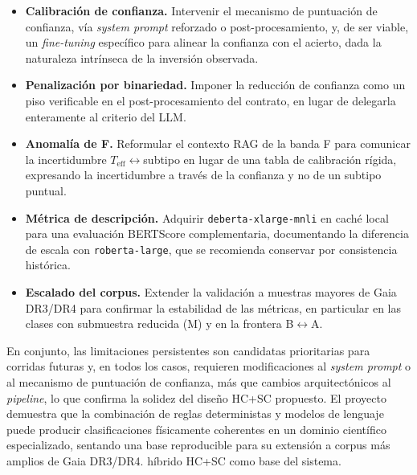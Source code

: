\begin{itemize}
  \item \textbf{Calibración de confianza.} Intervenir el mecanismo de puntuación de
  confianza, vía \emph{system prompt} reforzado o post-procesamiento, y, de ser
  viable, un \emph{fine-tuning} específico para alinear la confianza con el acierto,
  dada la naturaleza intrínseca de la inversión observada.
  \item \textbf{Penalización por binariedad.} Imponer la reducción de confianza como
  un piso verificable en el post-procesamiento del contrato, en lugar de delegarla
  enteramente al criterio del LLM.
  \item \textbf{Anomalía de F.} Reformular el contexto RAG de la banda F para
  comunicar la incertidumbre $T_\mathrm{eff}\leftrightarrow$subtipo en lugar de una
  tabla de calibración rígida, expresando la incertidumbre a través de la confianza
  y no de un subtipo puntual.
  \item \textbf{Métrica de descripción.} Adquirir \texttt{deberta-xlarge-mnli} en
  caché local para una evaluación BERTScore complementaria, documentando la
  diferencia de escala con \texttt{roberta-large}, que se recomienda conservar por
  consistencia histórica.
  \item \textbf{Escalado del corpus.} Extender la validación a muestras mayores de
  Gaia DR3/DR4 para confirmar la estabilidad de las métricas, en particular en las
  clases con submuestra reducida (M) y en la frontera B$\leftrightarrow$A.
\end{itemize}

En conjunto, las limitaciones persistentes son candidatas prioritarias para
corridas futuras y, en todos los casos, requieren modificaciones al \emph{system
prompt} o al mecanismo de puntuación de confianza, más que cambios
arquitectónicos al \emph{pipeline}, lo que confirma la solidez del diseño
HC+SC propuesto. El proyecto demuestra que la combinación de reglas
deterministas y modelos de lenguaje puede producir clasificaciones físicamente
coherentes en un dominio científico especializado, sentando una base reproducible
para su extensión a corpus más amplios de Gaia DR3/DR4.
híbrido HC+SC como base del sistema.